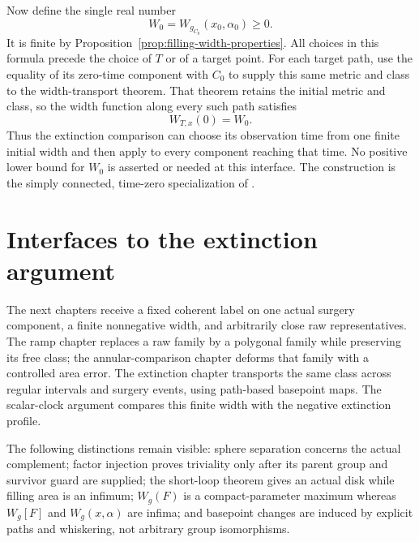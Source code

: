 Now define the single real number
\begin{equation}
 W_0=W_{g_{C_0}}(x_0,\alpha_0)\geq0.
 \label{eq:filling-fixed-initial-width}
\end{equation}
It is finite by Proposition~\ref{prop:filling-width-properties}.  All
choices in this formula precede the choice of $T$ or of a target point.
For each target path, use the equality of its zero-time component with
$C_0$ to supply this same metric and class to the width-transport theorem.
That theorem retains the initial metric and class, so the width function
along every such path satisfies
\[
 W_{T,x}(0)=W_0.
\]
Thus the extinction comparison can choose its observation time from one
finite initial width and then apply to every component reaching that time.
No positive lower bound for $W_0$ is asserted or needed at this interface.
The construction is the simply connected, time-zero specialization of
\cite[Proposition 18.18 and the proof of Theorem 18.1,
pp.~431--432]{MT2007}.

\section{Interfaces to the extinction argument}
\label{sec:filling-width-interfaces}

The next chapters receive a fixed coherent label on one actual surgery
component, a finite nonnegative width, and arbitrarily close raw
representatives. The ramp chapter replaces a raw family by a polygonal family
while preserving its free class; the annular-comparison chapter deforms that
family with a controlled area error. The extinction chapter transports the
same class across regular intervals and surgery events, using path-based
basepoint maps. The scalar-clock argument compares this finite width with the
negative extinction profile.

The following distinctions remain visible: sphere separation concerns the
actual complement; factor injection proves triviality only after its parent
group and survivor guard are supplied; the short-loop theorem gives an actual
disk while filling area is an infimum; $W_g(F)$ is a compact-parameter maximum
whereas $W_g[F]$ and $W_g(x,\alpha)$ are infima; and basepoint changes are induced
by explicit paths and whiskering, not arbitrary group isomorphisms.

